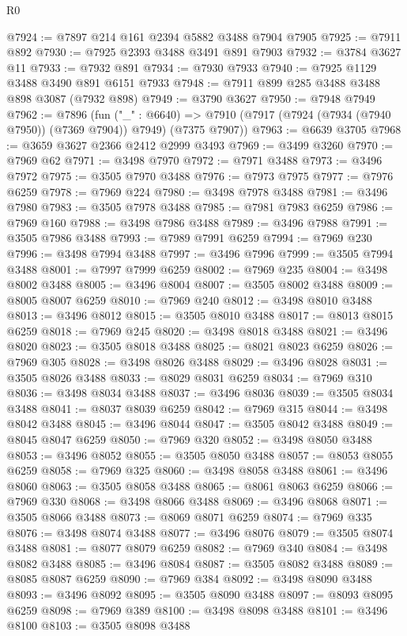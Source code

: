 \begin{lexlean}{R0}
\begin{coremodule}
@7924 := @7897 @214 @161 @2394 @5882 @3488 @7904 @7905
@7925 := @7911 @892
@7930 := @7925 @2393 @3488 @3491 @891 @7903
@7932 := @3784 @3627 @11
@7933 := @7932 @891
@7934 := @7930 @7933
@7940 := @7925 @1129 @3488 @3490 @891 @6151 @7933
@7948 := @7911 @899 @285 @3488 @3488 @898 @3087 (@7932 @898)
@7949 := @3790 @3627
@7950 := @7948 @7949
@7962 := @7896
    (fun ("_" : @6640) =>
    @7910 (@7917 (@7924 (@7934 (@7940 @7950)) (@7369 @7904)) @7949) (@7375 @7907))
@7963 := @6639 @3705
@7968 := @3659 @3627 @2366 @2412 @2999 @3493
@7969 := @3499 @3260
@7970 := @7969 @62
@7971 := @3498 @7970
@7972 := @7971 @3488
@7973 := @3496 @7972
@7975 := @3505 @7970 @3488
@7976 := @7973 @7975
@7977 := @7976 @6259
@7978 := @7969 @224
@7980 := @3498 @7978 @3488
@7981 := @3496 @7980
@7983 := @3505 @7978 @3488
@7985 := @7981 @7983 @6259
@7986 := @7969 @160
@7988 := @3498 @7986 @3488
@7989 := @3496 @7988
@7991 := @3505 @7986 @3488
@7993 := @7989 @7991 @6259
@7994 := @7969 @230
@7996 := @3498 @7994 @3488
@7997 := @3496 @7996
@7999 := @3505 @7994 @3488
@8001 := @7997 @7999 @6259
@8002 := @7969 @235
@8004 := @3498 @8002 @3488
@8005 := @3496 @8004
@8007 := @3505 @8002 @3488
@8009 := @8005 @8007 @6259
@8010 := @7969 @240
@8012 := @3498 @8010 @3488
@8013 := @3496 @8012
@8015 := @3505 @8010 @3488
@8017 := @8013 @8015 @6259
@8018 := @7969 @245
@8020 := @3498 @8018 @3488
@8021 := @3496 @8020
@8023 := @3505 @8018 @3488
@8025 := @8021 @8023 @6259
@8026 := @7969 @305
@8028 := @3498 @8026 @3488
@8029 := @3496 @8028
@8031 := @3505 @8026 @3488
@8033 := @8029 @8031 @6259
@8034 := @7969 @310
@8036 := @3498 @8034 @3488
@8037 := @3496 @8036
@8039 := @3505 @8034 @3488
@8041 := @8037 @8039 @6259
@8042 := @7969 @315
@8044 := @3498 @8042 @3488
@8045 := @3496 @8044
@8047 := @3505 @8042 @3488
@8049 := @8045 @8047 @6259
@8050 := @7969 @320
@8052 := @3498 @8050 @3488
@8053 := @3496 @8052
@8055 := @3505 @8050 @3488
@8057 := @8053 @8055 @6259
@8058 := @7969 @325
@8060 := @3498 @8058 @3488
@8061 := @3496 @8060
@8063 := @3505 @8058 @3488
@8065 := @8061 @8063 @6259
@8066 := @7969 @330
@8068 := @3498 @8066 @3488
@8069 := @3496 @8068
@8071 := @3505 @8066 @3488
@8073 := @8069 @8071 @6259
@8074 := @7969 @335
@8076 := @3498 @8074 @3488
@8077 := @3496 @8076
@8079 := @3505 @8074 @3488
@8081 := @8077 @8079 @6259
@8082 := @7969 @340
@8084 := @3498 @8082 @3488
@8085 := @3496 @8084
@8087 := @3505 @8082 @3488
@8089 := @8085 @8087 @6259
@8090 := @7969 @384
@8092 := @3498 @8090 @3488
@8093 := @3496 @8092
@8095 := @3505 @8090 @3488
@8097 := @8093 @8095 @6259
@8098 := @7969 @389
@8100 := @3498 @8098 @3488
@8101 := @3496 @8100
@8103 := @3505 @8098 @3488

\end{coremodule}
\end{lexlean}
